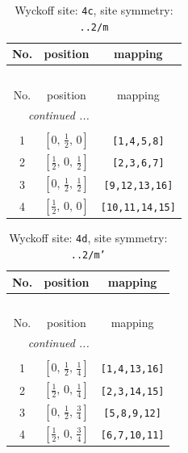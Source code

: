 \documentclass[fleqn,8pt]{jsarticle}
\begin{document}
\renewcommand{\arraystretch}{1.2}
\begin{longtable}{ccc}
\caption{Wyckoff site: {\tt 4c}, site symmetry: {\tt ..2/m}}
 \\
 \hline \hline
No. & position & mapping \\ \hline \endfirsthead

\multicolumn{2}{l}{\tablename\ \thetable{}} \\
 \hline \hline
No. & position & mapping \\ \hline \endhead

 \hline \hline
\multicolumn{2}{r}{\footnotesize\it continued ...} \\ \endfoot

 \hline \hline
\multicolumn{2}{r}{} \\ \endlastfoot

1 & $\left[ 0,\, \frac{1}{2},\, 0 \right]$ & {\tt [1,4,5,8]} \\ \hline
2 & $\left[ \frac{1}{2},\, 0,\, \frac{1}{2} \right]$ & {\tt [2,3,6,7]} \\ \hline
3 & $\left[ 0,\, \frac{1}{2},\, \frac{1}{2} \right]$ & {\tt [9,12,13,16]} \\ \hline
4 & $\left[ \frac{1}{2},\, 0,\, 0 \right]$ & {\tt [10,11,14,15]} \\
\end{longtable}
\renewcommand{\arraystretch}{1.2}
\begin{longtable}{ccc}
\caption{Wyckoff site: {\tt 4d}, site symmetry: {\tt ..2/m'}}
 \\
 \hline \hline
No. & position & mapping \\ \hline \endfirsthead

\multicolumn{2}{l}{\tablename\ \thetable{}} \\
 \hline \hline
No. & position & mapping \\ \hline \endhead

 \hline \hline
\multicolumn{2}{r}{\footnotesize\it continued ...} \\ \endfoot

 \hline \hline
\multicolumn{2}{r}{} \\ \endlastfoot

1 & $\left[ 0,\, \frac{1}{2},\, \frac{1}{4} \right]$ & {\tt [1,4,13,16]} \\ \hline
2 & $\left[ \frac{1}{2},\, 0,\, \frac{1}{4} \right]$ & {\tt [2,3,14,15]} \\ \hline
3 & $\left[ 0,\, \frac{1}{2},\, \frac{3}{4} \right]$ & {\tt [5,8,9,12]} \\ \hline
4 & $\left[ \frac{1}{2},\, 0,\, \frac{3}{4} \right]$ & {\tt [6,7,10,11]} \\
\end{longtable}
\end{document}
